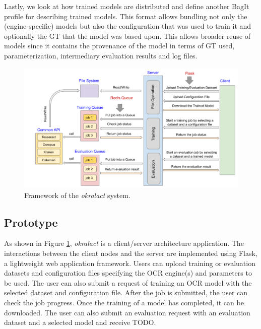 \documentclass[conference]{IEEEtran}
\begin{document}
Lastly, we look at how trained models are distributed and
define another BagIt profile for describing trained models. This
format allows bundling not only the (engine-specific) models but
also the configuration that was used to train it and optionally the
GT that the model was based upon. 
This allows broader reuse of models
since it contains the provenance of the model in terms of GT used,
parameterization, intermediary evaluation results and log files.


\begin{figure}[ht!]
        \begin{center}
     \includegraphics[width=0.8\linewidth]{Figures/Framework.png}
        \end{center}
        \caption{\small{Framework of the \textit{okralact} system.}}
\label{fig:framework}
\end{figure}

\subsection{Prototype}
\label{sec:prototype}

As shown in Figure \ref{fig:framework}, \textit{okralact} is a client/server
architecture application. The interactions between the client nodes and the
server are implemented using Flask, a lightweight web application framework.
Users can upload training or evaluation datasets and configuration files
specifying the OCR engine(s) and parameters to be used. The user
can also submit a request of training an OCR model with the selected
dataset and configuration file. After the job is submitted, the
user can check the job progress. Once the training of a model has
completed, it can be downloaded. The user can also submit an
evaluation request with an evaluation dataset and a selected model
and receive TODO.
\end{document}
